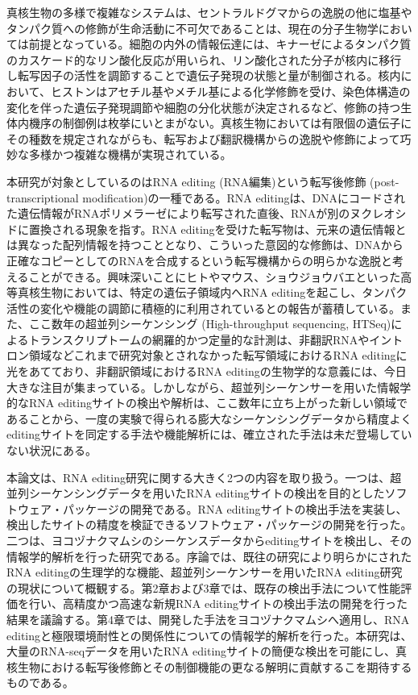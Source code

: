 \par
真核生物の多様で複雑なシステムは、セントラルドグマからの逸脱の他に塩基やタンパク質への修飾が生命活動に不可欠であることは、現在の分子生物学においては前提となっている。細胞の内外の情報伝達には、キナーゼによるタンパク質のカスケード的なリン酸化反応が用いられ、リン酸化された分子が核内に移行し転写因子の活性を調節することで遺伝子発現の状態と量が制御される。核内において、ヒストンはアセチル基やメチル基による化学修飾を受け、染色体構造の変化を伴った遺伝子発現調節や細胞の分化状態が決定されるなど、修飾の持つ生体内機序の制御例は枚挙にいとまがない。真核生物においては有限個の遺伝子にその種数を規定されながらも、転写および翻訳機構からの逸脱や修飾によって巧妙な多様かつ複雑な機構が実現されている。
\par
本研究が対象としているのはRNA editing (RNA編集)という転写後修飾 (post-transcriptional modification)の一種である。RNA 
editingは、DNAにコードされた遺伝情報がRNAポリメラーゼにより転写された直後、RNAが別のヌクレオシドに置換される現象を指す。RNA editingを受けた転写物は、元来の遺伝情報とは異なった配列情報を持つこととなり、こういった意図的な修飾は、DNAから正確なコピーとしてのRNAを合成するという転写機構からの明らかな逸脱と考えることができる。興味深いことにヒトやマウス、ショウジョウバエといった高等真核生物においては、特定の遺伝子領域内へRNA editingを起こし、タンパク活性の変化や機能の調節に積極的に利用されているとの報告が蓄積している。また、ここ数年の超並列シーケンシング (High-throughput sequencing, HTSeq)によるトランスクリプトームの網羅的かつ定量的な計測は、非翻訳RNAやイントロン領域などこれまで研究対象とされなかった転写領域におけるRNA editingに光をあてており、非翻訳領域におけるRNA editingの生物学的な意義には、今日大きな注目が集まっている。しかしながら、超並列シーケンサーを用いた情報学的なRNA editingサイトの検出や解析は、ここ数年に立ち上がった新しい領域であることから、一度の実験で得られる膨大なシーケンシングデータから精度よくeditingサイトを同定する手法や機能解析には、確立された手法は未だ登場していない状況にある。
\par
本論文は、RNA editing研究に関する大きく2つの内容を取り扱う。一つは、超並列シーケンシングデータを用いたRNA editingサイトの検出を目的としたソフトウェア・パッケージの開発である。RNA editingサイトの検出手法を実装し、検出したサイトの精度を検証できるソフトウェア・パッケージの開発を行った。二つは、ヨコヅナクマムシのシーケンスデータからeditingサイトを検出し、その情報学的解析を行った研究である。序論では、既往の研究により明らかにされたRNA editingの生理学的な機能、超並列シーケンサーを用いたRNA editing研究の現状について概観する。第2章および3章では、既存の検出手法について性能評価を行い、高精度かつ高速な新規RNA editingサイトの検出手法の開発を行った結果を議論する。第4章では、開発した手法をヨコヅナクマムシへ適用し、RNA editingと極限環境耐性との関係性についての情報学的解析を行った。本研究は、大量のRNA-seqデータを用いたRNA editingサイトの簡便な検出を可能にし、真核生物における転写後修飾とその制御機能の更なる解明に貢献するこを期待するものである。

